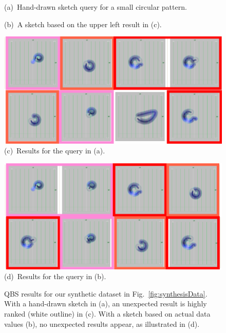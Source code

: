 \begin{figure}[tb]
\begin{minipage}{0.49\linewidth}
    \end{minipage}
    \begin{minipage}{0.49\linewidth}
        \centering
        \footnotesize{\sf (a)~Hand-drawn sketch query for a small circular pattern.}
    \end{minipage}
    \begin{minipage}{0.49\linewidth}
        \centering
        \footnotesize{\sf (b)~A sketch based on the upper left result in (c). 
        }
    \end{minipage}
    \begin{minipage}{0.49\linewidth}
        \centering
        \includegraphics[width=.99\linewidth]{vgtc_journal_latex/figures/QBSResultsHanddrawn.png}\\
        \footnotesize{\sf (c)~Results for the query in (a).}
    \end{minipage}
    \begin{minipage}{0.49\linewidth}
        \centering
        \includegraphics[width=.99\linewidth]{vgtc_journal_latex/figures/QBSResultsResultQuery.png}\\
        \footnotesize{\sf (d)~Results for the query in (b).}
    \end{minipage}
    \caption{QBS results for our synthetic dataset in Fig.~\ref{fig:synthesisData}.
        With a hand-drawn sketch in (a), an unexpected result is highly ranked (white outline) in (c). 
        With a sketch based on actual data values (b), no unexpected results appear, as illustrated in (d).
        }
    \label{fig:QBSDemodata}
\end{figure}
